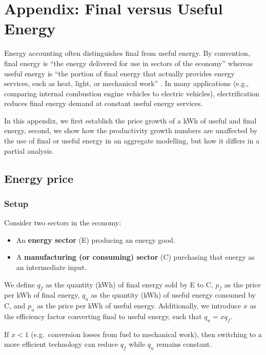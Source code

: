 \documentclass[11pt]{article}
\begin{document}

\section{Appendix: Final versus Useful Energy}
\label{appendix_useful_energy}

Energy accounting often distinguishes final from useful energy. By convention, final energy is “the energy delivered for use in sectors of the economy” whereas useful energy is “the portion of final energy that actually provides energy services, such as heat, light, or mechanical work” \citep{wayEmpiricallyGroundedTechnology2022}. In many applications (e.g., comparing internal combustion engine vehicles to electric vehicles), electrification reduces final energy demand at constant useful energy services.

In this appendix, we first establish the price growth of a kWh of useful and final energy, second, we show how the productivity growth numbers are unaffected by the use of final or useful energy in an aggregate modelling, but how it differs in a partial analysis.


\subsection{Energy price}

\subsubsection{Setup}

Consider two sectors in the economy:

\begin{itemize}
    \item An \textbf{energy sector} (E) producing an energy good.
    \item A \textbf{manufacturing (or consuming) sector} (C) purchasing that energy as an intermediate input.
\end{itemize}

We define $q_f$ as the quantity (kWh) of final energy sold by E to C, $p_f$ as the price per kWh of final energy, $q_u$ as the quantity (kWh) of useful energy consumed by C, and $p_u$ as the price per kWh of useful energy. Additionally, we introduce $x$ as the efficiency factor converting final to useful energy, such that $q_u = x q_f$.

If $x < 1$ (e.g.\ conversion losses from fuel to mechanical work), then switching to a more efficient technology can reduce $q_f$ while $q_u$ remains constant.
\end{document}
